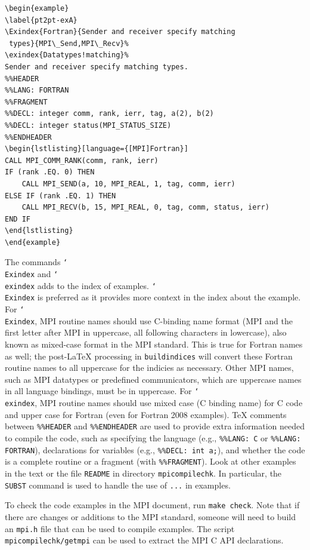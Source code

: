 \documentclass[letterpaper,twoside,11pt,fleqn]{article}
\def\cmd#1{\texttt{\char`\\#1}}
\def\MPI/{\textsf{MPI}}    %
\begin{document}
\begin{verbatim}
\begin{example}
\label{pt2pt-exA}
\Exindex{Fortran}{Sender and receiver specify matching
 types}{MPI\_Send,MPI\_Recv}%
\exindex{Datatypes!matching}%
Sender and receiver specify matching types.
%%HEADER
%%LANG: FORTRAN
%%FRAGMENT
%%DECL: integer comm, rank, ierr, tag, a(2), b(2)
%%DECL: integer status(MPI_STATUS_SIZE)
%%ENDHEADER
\begin{lstlisting}[language={[MPI]Fortran}]
CALL MPI_COMM_RANK(comm, rank, ierr)
IF (rank .EQ. 0) THEN
    CALL MPI_SEND(a, 10, MPI_REAL, 1, tag, comm, ierr)
ELSE IF (rank .EQ. 1) THEN
    CALL MPI_RECV(b, 15, MPI_REAL, 0, tag, comm, status, ierr)
END IF
\end{lstlisting}
\end{example}
\end{verbatim}

The commands \cmd{Exindex} and \cmd{exindex} adds to the index of examples.
\cmd{Exindex} is preferred as it provides more context in the index
about the example.
For \cmd{Exindex}, \MPI/ routine names should use C-binding name
format (MPI and the first letter after MPI in uppercase, all following
characters in lowercase), also known as mixed-case format in the \MPI/
standard.
This is true for Fortran names as well; the post-LaTeX processing in
\texttt{buildindices} will convert these Fortran routine names to all
uppercase for the indicies as necessary.
Other \MPI/ names, such as MPI datatypes or predefined communicators,
which are uppercase names in all language bindings, must be in
uppercase.
For \cmd{exindex}, \MPI/ routine names should use mixed case (C
binding name) for C code and upper case for Fortran (even for Fortran
2008 examples).
TeX comments between \verb+%%HEADER+ and \verb+%%ENDHEADER+ are used
to provide extra information needed to compile the code, such as
specifying the language (e.g., \verb+%%LANG: C+ or
\verb+%%LANG: FORTRAN+), declarations for variables (e.g.,
\verb+%%DECL: int a;+), and whether the code is a complete routine or a
fragment (with \verb+%%FRAGMENT+).  Look at other examples in the text
or the file \texttt{README} in directory \texttt{mpicompilechk}.
In particular, the \texttt{SUBST} command is used to handle the use of
\texttt{...} in examples.

To check the code examples in the \MPI/ document, run \texttt{make
  check}.
Note that if there are changes or additions to the \MPI/ standard,
someone will need to build an \texttt{mpi.h} file that can be used to
compile examples.  The script \texttt{mpicompilechk/getmpi} can be
used to extract the \MPI/ C API declarations.
\end{document}
